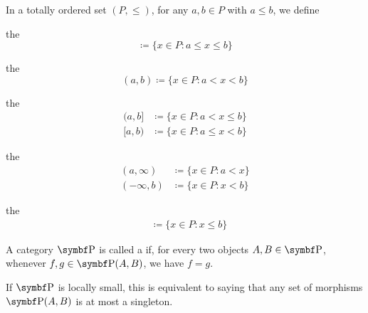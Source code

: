 \begin{definition}\label{def:total_order_interval}\cite{nLab:order_topology}
  In a totally ordered set \( (P, \leq) \), for any \( a, b \in P \) with \( a \leq b \), we define
  \begin{defenum}
     the 
    \begin{equation*}
      [a, b] \coloneqq \{ x \in P \colon a \leq x \leq b \}
    \end{equation*}

     the 
    \begin{equation*}
      (a, b) \coloneqq \{ x \in P \colon a < x < b \}
    \end{equation*}

     the 
    \begin{align*}
      (a, b] &\coloneqq \{ x \in P \colon a < x \leq b \}
      \\
      [a, b) &\coloneqq \{ x \in P \colon a \leq x < b \}
    \end{align*}

     the 
    \begin{align*}
      (a, \infty) &\coloneqq \{ x \in P \colon a < x \}
      \\
      (-\infty, b) &\coloneqq \{ x \in P \colon x < b \}
    \end{align*}

     the 
    \begin{align*}
      [a, \infty) &\coloneqq \{ x \in P \colon a \leq x \}
      \\
      (-\infty, b] &\coloneqq \{ x \in P \colon x \leq b \}
    \end{align*}
  \end{defenum}
\end{definition}

\begin{definition}\label{def:thin_category}\cite{nLab:thin_category}
  A category \( \Cat{P} \) is called a  if, for every two objects \( A, B \in \Bold{P} \), whenever \( f, g \in \Bold{P}(A, B) \), we have \( f = g \).

  If \( \Cat{P} \) is locally small, this is equivalent to saying that any set of morphisms \( \Bold{P}(A, B) \) is at most a singleton.
\end{definition}

